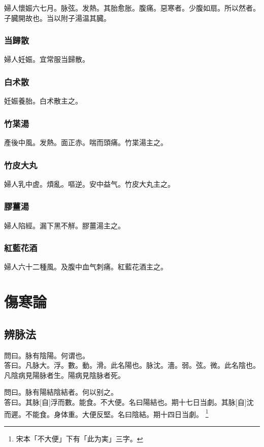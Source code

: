 \documentclass[12pt,twoside,UTF8,b5paper]{ctexbook}
\begin{document}
婦人懷娠六七月。脉弦。发熱。其胎愈胀。腹痛。惡寒者。少腹如扇。所以然者。子臓開故也。当以附子湯温其臓。

\section{当歸散}

婦人妊娠。宜常服当歸散。

\section{白术散}

妊娠養胎。白术散主之。

\section{竹枼湯}

產後中風。发熱。面正赤。喘而頭痛。竹枼湯主之。

\section{竹皮大丸}

婦人乳中虗。煩亂。嘔逆。安中益气。竹皮大丸主之。

\section{膠薑湯}

婦人陷經。漏下黑不觧。膠薑湯主之。

\section{紅藍花酒}

婦人六十二種風。及腹中血气刺痛。紅藍花酒主之。

\part{傷寒論}

\chapter{辨脉法}

問曰。脉有陰陽。何谓也。\\
答曰。凡脉大。浮。數。動。滑。此名陽也。脉沈。濇。弱。弦。微。此名陰也。凡陰病見陽脉者生。陽病見陰脉者死。

問曰。脉有陽結陰結者。何以别之。\\
答曰。其脉[自]浮而數。能食。不大便。名曰陽結也。期十七日当劇。其脉[自]沈而遲。不能食。身体重。大便反堅。名曰陰結。期十四日当劇。
	\footnote{宋本「不大便」下有「此为実」三字。}
\end{document}
